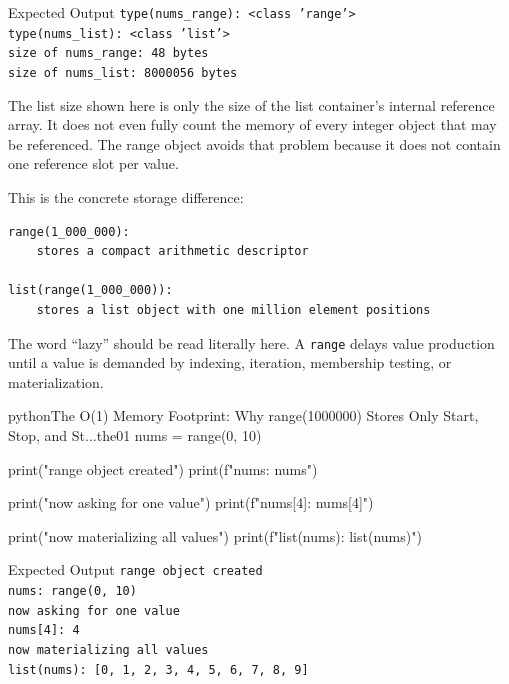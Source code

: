 \documentclass[a4paper,twoside]{report}
\begin{document}
\begin{iobox}{Expected Output}
\texttt{type(nums\_range): <class 'range'>} \\
\texttt{type(nums\_list): <class 'list'>} \\
\texttt{size of nums\_range: 48 bytes} \\
\texttt{size of nums\_list:  8000056 bytes} \\
\end{iobox}


The list size shown here is only the size of the list container's internal reference array. It does not even fully count the memory of every integer object that may be referenced. The range object avoids that problem because it does not contain one reference slot per value.

This is the concrete storage difference:

\begin{verbatim}
range(1_000_000):
    stores a compact arithmetic descriptor

list(range(1_000_000)):
    stores a list object with one million element positions
\end{verbatim}

The word \enquote{lazy} should be read literally here. A \texttt{range} delays value production until a value is demanded by indexing, iteration, membership testing, or materialization.

\begin{codebox}[]{python}{The O(1) Memory Footprint: Why range(1000000) Stores Only Start, Stop, and St...}{the01}
nums = range(0, 10)

print("range object created")
print(f"nums: {nums}")

print("now asking for one value")
print(f"nums[4]: {nums[4]}")

print("now materializing all values")
print(f"list(nums): {list(nums)}")
\end{codebox}


\begin{iobox}{Expected Output}
\texttt{range object created} \\
\texttt{nums: range(0, 10)} \\
\texttt{now asking for one value} \\
\texttt{nums[4]: 4} \\
\texttt{now materializing all values} \\
\texttt{list(nums): [0, 1, 2, 3, 4, 5, 6, 7, 8, 9]} \\
\end{iobox}
\end{document}
